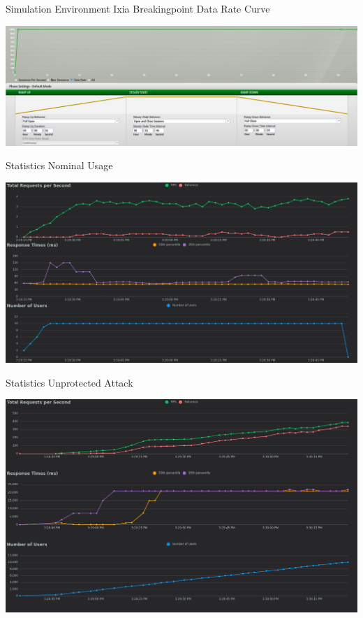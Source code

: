 \documentclass{beamer}
\begin{document}
\begin{frame}{Simulation Environment}
    Ixia Breakingpoint Data Rate Curve
    \vspace{1em}
    \begin{center}
        \includegraphics[width=\textwidth]{images/breakingpoint_curve.png}
    \end{center}
\end{frame}

\begin{frame}{Statistics}
    Nominal Usage
    \vspace{1em}
    \begin{center}
        \includegraphics[width=\textwidth]{images/nominal_usage.png}
    \end{center}
\end{frame}

\begin{frame}{Statistics}
    Unprotected Attack
    \vspace{1em}
    \begin{center}
        \includegraphics[width=\textwidth]{images/ddos_usage.png}
    \end{center}
\end{frame}
\end{document}
